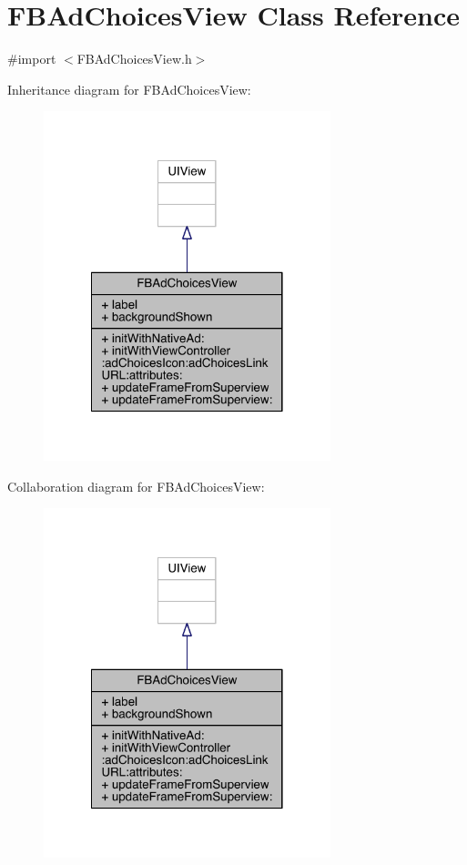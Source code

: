 \hypertarget{interface_f_b_ad_choices_view}{\section{F\-B\-Ad\-Choices\-View Class Reference}
\label{interface_f_b_ad_choices_view}
}


{\ttfamily \#import $<$F\-B\-Ad\-Choices\-View.\-h$>$}



Inheritance diagram for F\-B\-Ad\-Choices\-View\-:
\nopagebreak
\begin{figure}[H]
\begin{center}
\leavevmode
\includegraphics[width=236pt]{interface_f_b_ad_choices_view__inherit__graph}
\end{center}
\end{figure}


Collaboration diagram for F\-B\-Ad\-Choices\-View\-:
\nopagebreak
\begin{figure}[H]
\begin{center}
\leavevmode
\includegraphics[width=236pt]{interface_f_b_ad_choices_view__coll__graph}
\end{center}
\end{figure}
